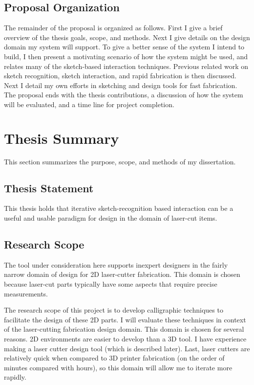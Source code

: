 \documentclass[11pt]{article}
\begin{document}
\subsection{Proposal Organization}

The remainder of the proposal is organized as follows. First I give a
brief overview of the thesis goals, scope, and methods. Next I give
details on the design domain my system will support. To give a better
sense of the system I intend to build, I then present a motivating
scenario of how the system might be used, and relates many of the
sketch-based interaction techniques. Previous related work on sketch
recognition, sketch interaction, and rapid fabrication is then
discussed. Next I detail my own efforts in sketching and design tools
for fast fabrication. The proposal ends with the thesis contributions,
a discussion of how the system will be evaluated, and a time line for
project completion.

\section{Thesis Summary}

This section summarizes the purpose, scope, and methods of my
dissertation.

\subsection{Thesis Statement}

This thesis holds that iterative sketch-recognition based interaction
can be a useful and usable paradigm for design in the domain of
laser-cut items.

\subsection{Research Scope}

The tool under consideration here supports inexpert designers in the
fairly narrow domain of design for 2D laser-cutter fabrication. This
domain is chosen because laser-cut parts typically have some aspects
that require precise measurements.

The research scope of this project is to develop calligraphic
techniques to facilitate the design of these 2D parts. I will evaluate
these techniques in context of the laser-cutting fabrication design
domain. This domain is chosen for several reasons. 2D environments are
easier to develop than a 3D tool. I have experience making a laser
cutter design tool (which is described later). Last, laser cutters are
relatively quick when compared to 3D printer fabrication (on the order
of minutes compared with hours), so this domain will allow me to
iterate more rapidly.
\end{document}
